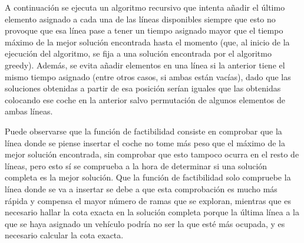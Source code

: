A continuación se ejecuta un algoritmo recursivo que intenta añadir el último elemento asignado a cada una de las líneas disponibles siempre que esto no provoque que esa línea pase a tener un tiempo asignado mayor que el tiempo máximo de la mejor solución encontrada hasta el momento (que, al inicio de la ejecución del algoritmo, se fija a una solución encontrada por el algoritmo greedy). Además, se evita añadir elementos en una línea si la anterior tiene el mismo tiempo asignado (entre otros casos, si ambas están vacías), dado que las soluciones obtenidas a partir de esa posición serían iguales que las obtenidas colocando ese coche en la anterior salvo permutación de algunos elementos de ambas líneas.


Puede observarse que la función de factibilidad consiste en comprobar que la línea donde se piense insertar el coche no tome más peso que el máximo de la mejor solución encontrada, sin comprobar que esto tampoco ocurra en el resto de líneas, pero esto sí se comprueba a la hora de determinar si una solución completa es la mejor solución. Que la función de factibilidad solo compruebe la línea donde se va a insertar se debe a que esta comprobación es mucho más rápida y compensa el mayor número de ramas que se exploran, mientras que es necesario hallar la cota exacta en la solución completa porque la última línea a la que se haya asignado un vehículo podría no ser la que esté más ocupada, y es necesario calcular la cota exacta.




